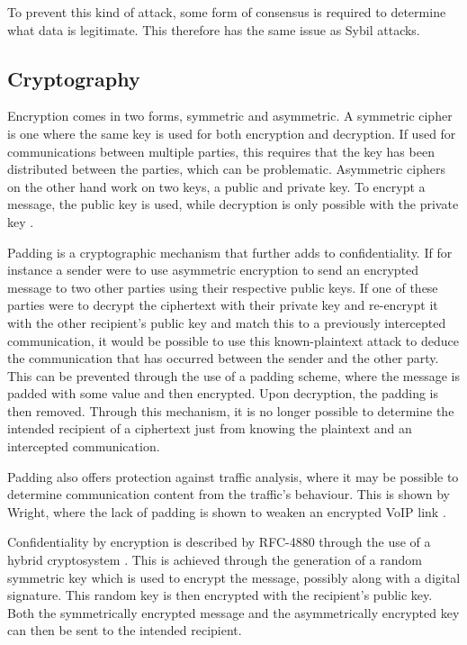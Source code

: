 			To prevent this kind of attack, some form of consensus is required to determine what data is legitimate. This therefore has the same issue as Sybil attacks.
	\subsection{Cryptography}
		Encryption comes in two forms, symmetric and asymmetric. A symmetric cipher is one where the same key is used for both encryption and decryption. If used for communications between multiple parties, this requires that the key has been distributed between the parties, which can be problematic. Asymmetric ciphers on the other hand work on two keys, a public and private key. To encrypt a message, the public key is used, while decryption is only possible with the private key \cite{appliedcrypto}. 
		
		Padding is a cryptographic mechanism that further adds to confidentiality. If for instance a sender were to use asymmetric encryption to send an encrypted message to two other parties using their respective public keys. If one of these parties were to decrypt the ciphertext with their private key and re-encrypt it with the other recipient's public key and match this to a previously intercepted communication, it would be possible to use this known-plaintext attack to deduce the communication that has occurred between the sender and the other party. This can be prevented through the use of a padding scheme, where the message is padded with some value and then encrypted. Upon decryption, the padding is then removed. Through this mechanism, it is no longer possible to determine the intended recipient of a ciphertext just from knowing the plaintext and an intercepted communication.
		
		Padding also offers protection against traffic analysis, where it may be possible to determine communication content from the traffic's behaviour. This is shown by Wright, where the lack of padding is shown to weaken an encrypted VoIP link \cite{Wright:2010:USP:1880022.1880029}.
	
		Confidentiality by encryption is described by RFC-4880 through the use of a hybrid cryptosystem \cite{network2007openpgp}. This is achieved through the generation of a random symmetric key which is used to encrypt the message, possibly along with a digital signature. This random key is then encrypted with the recipient's public key. Both the symmetrically encrypted message and the asymmetrically encrypted key can then be sent to the intended recipient.